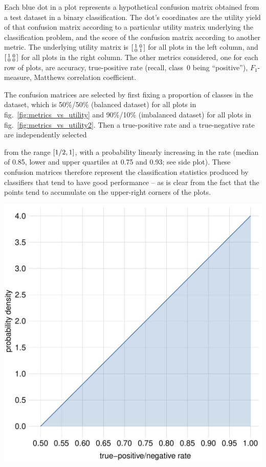 \documentclass[\ifafour a4paper,12pt,\else a5paper,10pt,\fi%
onecolumn,oneside,article,%
british%
]{memoir}
\theoremstyle{remark}
\theoremstyle{innote}
\DeclarePairedDelimiter\clcl{[}{]}
\renewcommand*{\|}[1][]{\nonscript\:#1\vert\nonscript\:\mathopen{}}
\newcommand*{\fig}{fig.}%
\newcommand*{\sumatrix}[4]{\begin{bsmallmatrix*}[r]#1&#2\\#3&#4\end{bsmallmatrix*}}
\newcounter{dummy}
\begin{document}
Each blue dot in a plot represents a hypothetical confusion matrix obtained from a test dataset in a binary classification. The dot's coordinates are the utility yield of that confusion matrix according to a particular utility matrix underlying the classification problem, and the score of the confusion matrix according to another metric. The underlying utility matrix is $\sumatrix{ 1}{0}{0}{1 }$ for all plots in the left column, and $\sumatrix{ 1}{0}{0}{0 }$ for all plots in the right column. The other metrics considered, one for each row of plots, are accuracy, true-positive rate (recall, class~0 being \enquote{positive}), $F_{1}$-measure, Matthews correlation coefficient.

The confusion matrices are selected by first fixing a proportion of classes in the dataset, which is 50\%/50\% (balanced dataset) for all plots in \fig~\ref{fig:metrics_vs_utility} and 90\%/10\% (imbalanced dataset) for all plots in \fig~\ref{fig:metrics_vs_utility2}. Then a %
true-positive rate and a true-negative rate are independently selected %
\begin{minipage}[t]{0.66\linewidth}
from the range $\clcl{1/2,1}$, with a probability linearly increasing in the rate (median of 0.85, lower and upper quartiles at 0.75 and 0.93; see side plot). These confusion matrices therefore represent the classification statistics produced %
  by classifiers that tend to have good performance -- as is clear from the fact that the points tend to accumulate on the upper-right corners of the plots.
\end{minipage}%
\hfill\begin{minipage}[t]{0.32\linewidth}\vspace{0pt}
\centering\includegraphics[width=\linewidth]{TP_TN_prob.pdf}
\label{fig:linear_distr}  
\end{minipage}
\end{document}

